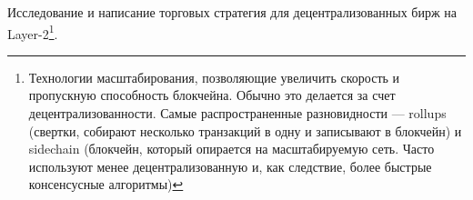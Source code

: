 Исследование и написание торговых стратегия для децентрализованных бирж на Layer-2\footnote{Технологии масштабирования, позволяющие увеличить скорость и пропускную способность блокчейна. Обычно это делается за счет децентрализованности. Самые распространенные разновидности — rollups (свертки, собирают несколько транзакций в одну и записывают в блокчейн) и sidechain (блокчейн, который опирается на масштабируемую сеть. Часто используют менее децентрализованную и, как следствие, более быстрые консенсусные алгоритмы)}.